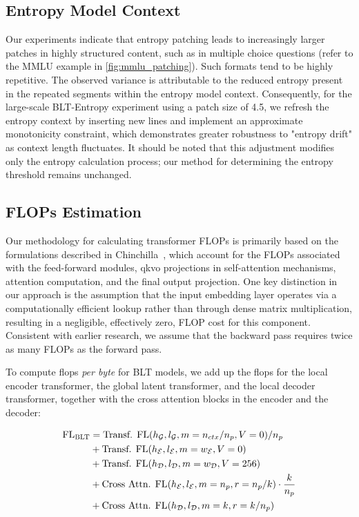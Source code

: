 \subsection{Entropy Model Context}
\label{section:entropy-context}
Our experiments indicate that entropy patching leads to increasingly larger patches in highly structured content, such as in multiple choice questions (refer to the MMLU example in \autoref{fig:mmlu_patching}). Such formats tend to be highly repetitive. The observed variance is attributable to the reduced entropy present in the repeated segments within the entropy model context. Consequently, for the large-scale {\textsc BLT}-Entropy experiment using a patch size of 4.5, we refresh the entropy context by inserting new lines and implement an approximate monotonicity constraint, which demonstrates greater robustness to "entropy drift" as context length fluctuates. It should be noted that this adjustment modifies only the entropy calculation process; our method for determining the entropy threshold remains unchanged.

\subsection{FLOPs Estimation} 
\label{section:flops}

Our methodology for calculating transformer FLOPs is primarily based on the formulations described in Chinchilla~\citep{hoffmann2022training}, which account for the FLOPs associated with the feed-forward modules, qkvo projections in self-attention mechanisms, attention computation, and the final output projection. One key distinction in our approach is the assumption that the input embedding layer operates via a computationally efficient lookup rather than through dense matrix multiplication, resulting in a negligible, effectively zero, FLOP cost for this component. Consistent with earlier research, we assume that the backward pass requires twice as many FLOPs as the forward pass.

To compute flops \textit{per byte} for {\textsc BLT} models, we add up the flops for the local encoder transformer, the global latent transformer, and the local decoder transformer, together with the cross attention blocks in the encoder and the decoder:

\begin{align}
    \text{FL}_{\text{{\textsc BLT}}} &= \text{Transf. FL}(h_{\mathcal{G}}, l_{\mathcal{G}}, m=n_{ctx}/n_p,V=0) / n_p\\
   &+ \text{Transf. FL}(h_{\mathcal{E}}, l_{\mathcal{E}}, m=w_{\mathcal{E}}, V=0) \\
   &+ \text{Transf. FL}(h_{\mathcal{D}}, l_{\mathcal{D}}, m=w_{\mathcal{D}}, V=256) \\ 
    &+ \text{Cross Attn. FL}(h_{\mathcal{E}}, l_{\mathcal{E}}, m=n_p, r=n_p/k) \cdot \frac{k}{n_p} \\ 
   &+ \text{Cross Attn. FL}(h_{\mathcal{D}}, l_{\mathcal{D}}, m=k, r=k/n_p)
\end{align}

